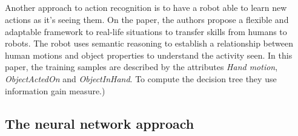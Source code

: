 \documentclass[a4paper]{article}
\begin{document}
		\subsection{}
			Another approach to action recognition is to have a robot able to learn new actions as it's seeing them. On the paper\cite{ramirez2014automatic}, the authors propose a flexible and adaptable framework to real-life situations to transfer skills from humans to robots. The robot uses semantic reasoning to establish a relationship between human motions and object properties to understand the activity seen. In this paper, the training samples are described by the attributes \textit{Hand motion}, \textit{ObjectActedOn} and \textit{ObjectInHand}. To compute the decision tree they use information gain measure.)

		\subsection{The neural network approach}





 
\end{document}
